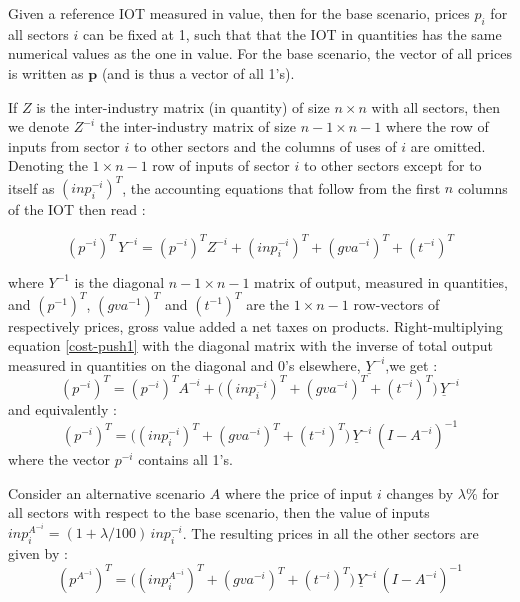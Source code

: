 \documentclass[12pt,english]{article}
\begin{document}
Given a reference IOT measured in value, then for the base scenario, prices $p_i$ for all sectors $i$ can be fixed at 1, such that that the IOT in quantities has the same numerical values as the one in value. For the base scenario, the vector of all prices is written as $\boldsymbol{p}$ (and is thus a vector of all 1's).

If $Z$ is the inter-industry matrix (in quantity) of size $n\times n$ with all sectors, then we denote $Z^{-i}$ the inter-industry matrix of size $n-1 \times n-1$ where the row of inputs from sector $i$ to other sectors and the columns of uses of $i$ are omitted. Denoting the $1 \times n-1$ row of inputs of sector $i$ to other sectors except for to itself as $(inp^{-i}_i)^T$, the accounting equations that follow from the first $n$ columns of the IOT then read :

\begin{equation}
(p^{-i})^T \, Y^{-i} = (p^{-i})^T Z^{-i} + (inp^{-i}_i)^T + (gva^{-i})^T + (t^{-i})^T \label{cost-push1}
\end{equation}

where $Y^{-1}$ is the diagonal $n-1 \times n-1$ matrix of output, measured in quantities, and $(p^{-1})^T$, $(gva^{-1})^T$  and $(t^{-1})^T$ are the $1 \times n-1$ row-vectors of respectively prices, gross value added a net taxes on products. Right-multiplying equation \ref{cost-push1} with the diagonal matrix with the inverse of total output measured in quantities on the diagonal and 0's elsewhere, $\underline{Y}^{-i}$,we get :
\begin{equation}
(p^{-i})^T  = (p^{-i})^T A^{-i} + \Big((inp^{-i}_i)^T + (gva^{-i})^T + (t^{-i})^T \Big)\, \underline{Y}^{-i} \label{cost-push2}
\end{equation}
and equivalently :
\begin{equation}
(p^{-i})^T  =  \Big((inp^{-i}_i)^T + (gva^{-i})^T + (t^{-i})^T \Big)\, \underline{Y}^{-i} \, (I - A^{-i})^{-1} \label{cost-push3}
\end{equation}
where the vector $p^{-i}$ contains all 1's.

Consider an alternative scenario $A$ where the price of input $i$ changes by $\lambda\%$ for all sectors with respect to the base scenario, then the value of inputs $inp^{A^{-i}}_{i} = (1+\lambda/100)\, inp^{-i}_i$. The resulting prices in all the other sectors are given by :
\begin{equation}
(p^{A^{-i}})^T  =  \Big((inp^{A^{-i}}_i)^T + (gva^{-i})^T + (t^{-i})^T \Big)\, \underline{Y}^{-i} \, (I - A^{-i})^{-1} \label{cost-push-scen}
\end{equation}
\end{document}
